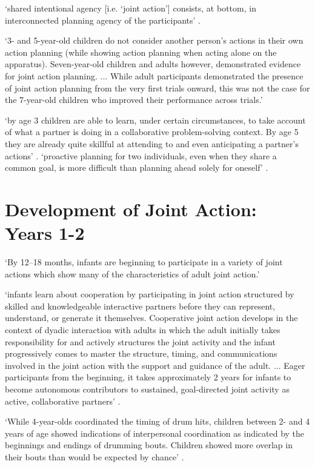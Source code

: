 \documentclass[12pt]{extarticle}
\begin{document}
\begin{multicols}{3}
‘shared intentional agency [i.e. ‘joint action’] consists, at bottom, in
interconnected planning agency of the participants’ \citep{Bratman:2011fk}.

‘3- and 5-year-old children do not consider another person’s actions in
their own action planning (while showing action planning when acting
alone on the apparatus).
Seven-year-old children and adults
however, demonstrated evidence for joint action planning. ... While adult participants
demonstrated the presence of joint action planning from the very
first trials onward, this was not the case for the 7-year-old
children who improved their performance across trials.’
\citep[p.~1059]{paulus:2016_development}

‘by age 3 children are able to learn, under certain circumstances, to take
account of what a partner is doing in a collaborative problem-solving
context. By age 5 they are already quite skillful at attending to and even
anticipating a partner’s actions’ \citep[p.~57]{warneken:2014_young}.
‘proactive planning for two individuals, even
when they share a common goal, is more difficult than planning ahead solely
for oneself’ \citep[p.~128]{gerson:2016_social}.



\section{Development of Joint Action: Years 1-2}

‘By 12–18 months, infants are beginning to participate in a variety of
joint actions which show many of the characteristics of adult joint
action.’
\citep[p.~388]{carpenter:2009_howjoint}

‘infants learn about cooperation by participating in joint action
structured by skilled and knowledgeable interactive partners before they
can represent, understand, or generate it themselves. Cooperative joint
action develops in the context of dyadic interaction with adults in which
the adult initially takes responsibility for and actively structures the
joint activity and the infant progressively comes to master the
structure, timing, and communications involved in the joint action with
the support and guidance of the adult. ... Eager participants from the
beginning, it takes approximately 2 years for infants to become
autonomous contributors to sustained, goal-directed joint activity as
active, collaborative partners’
\citep[p.~200]{brownell:2011_early}.

‘While 4-year-olds coordinated the timing of drum hits, children between 2-
and 4 years of age showed indications of interpersonal coordination as
indicated by the beginnings and endings of drumming bouts. Children
showed more overlap in their bouts than would be expected by chance’
\citep[p.~720]{endedijk:2015_development}.


\end{multicols}
\end{document}

